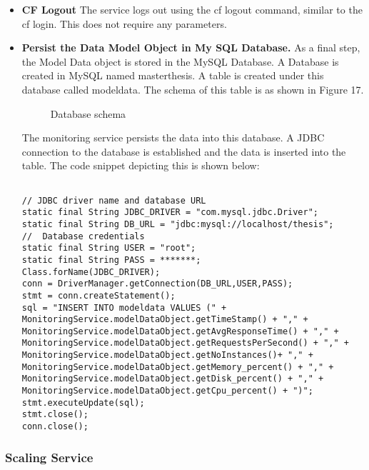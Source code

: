 \documentclass[article,type=msc,colorback,12pt,accentcolor=tud7b,table]{tudthesis}
\begin{document}
\begin{itemize}
\begin{lstlisting}
\end{lstlisting}
		
\item{\textbf{CF Logout}} The service logs out using the cf logout command, similar to the cf login. This does not require any parameters.
		
\item{\textbf{Persist the Data Model Object in My SQL Database.}} As  a final step, the Model Data object is stored in the MySQL Database. A Database is created in MySQL named masterthesis. A table is created under this database called modeldata. The schema of this table is as shown in Figure 17.

 \begin{figure}[h]
 	\begin{center}
 		\makebox[\textwidth]{\texttt{[image: D5]}}
 	\end{center}
 	\caption{Database schema}
 \end{figure}	

The monitoring service persists the data into this database. A JDBC connection to the database is established and the data is inserted into the table. The code snippet depicting this is shown below:

\begin{lstlisting}

// JDBC driver name and database URL
static final String JDBC_DRIVER = "com.mysql.jdbc.Driver";  
static final String DB_URL = "jdbc:mysql://localhost/thesis";
//  Database credentials
static final String USER = "root";
static final String PASS = *******;
Class.forName(JDBC_DRIVER);
conn = DriverManager.getConnection(DB_URL,USER,PASS);
stmt = conn.createStatement();
sql = "INSERT INTO modeldata VALUES (" + 
MonitoringService.modelDataObject.getTimeStamp() + "," + 
MonitoringService.modelDataObject.getAvgResponseTime() + "," + 
MonitoringService.modelDataObject.getRequestsPerSecond() + "," + 
MonitoringService.modelDataObject.getNoInstances()+ "," + 
MonitoringService.modelDataObject.getMemory_percent() + "," + 
MonitoringService.modelDataObject.getDisk_percent() + "," +
MonitoringService.modelDataObject.getCpu_percent() + ")";				
stmt.executeUpdate(sql);
stmt.close();	    
conn.close();	    
\end{lstlisting}		
\end{itemize}	
\subsubsection{Scaling Service}
	
\end{document}
